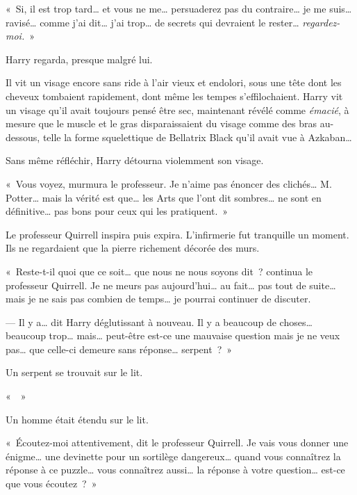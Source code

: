 «~Si, il est trop tard… et vous ne me… persuaderez pas du contraire… je me suis… ravisé… comme j'ai dit… j'ai trop… de secrets qui devraient le rester… \emph{regardez-moi.}~»

Harry regarda, presque malgré lui.

Il vit un visage encore sans ride à l'air vieux et endolori, sous une tête dont les cheveux tombaient rapidement, dont même les tempes s'effilochaient. Harry vit un visage qu'il avait toujours pensé être sec, maintenant révélé comme \emph{émacié}, à mesure que le muscle et le gras disparaissaient du visage comme des bras au-dessous, telle la forme squelettique de Bellatrix Black qu'il avait vue à Azkaban…

Sans même réfléchir, Harry détourna violemment son visage.

«~Vous voyez, murmura le professeur. Je n'aime pas énoncer des clichés… M. Potter… mais la vérité est que… les Arts que l'ont dit sombres… ne sont en définitive… pas bons pour ceux qui les pratiquent.~»

Le professeur Quirrell inspira puis expira. L'infirmerie fut tranquille un moment. Ils ne regardaient que la pierre richement décorée des murs.

«~Reste-t-il quoi que ce soit… que nous ne nous soyons dit~? continua le professeur Quirrell. Je ne meurs pas aujourd'hui… au fait… pas tout de suite… mais je ne sais pas combien de temps… je pourrai continuer de discuter.

--- Il y a… dit Harry déglutissant à nouveau. Il y a beaucoup de choses… beaucoup trop… mais… peut-être est-ce une mauvaise question mais je ne veux pas… que celle-ci demeure sans réponse… serpent~?~»

Un serpent se trouvait sur le lit.

«~~»

Un homme était étendu sur le lit.

«~Écoutez-moi attentivement, dit le professeur Quirrell. Je vais vous donner une énigme… une devinette pour un sortilège dangereux… quand vous connaîtrez la réponse à ce puzzle… vous connaîtrez aussi… la réponse à votre question… est-ce que vous écoutez~?~»

